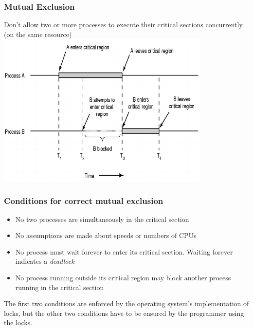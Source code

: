 \documentclass[12pt]{article}
\begin{document}
\subsubsection{Mutual Exclusion}
Don’t allow two or more processes to execute their critical sections concurrently (on the same resource)
\newline
\includegraphics[width=0.8\textwidth]{MutualExclusionOverview.png}
\subsubsection{Conditions for correct mutual exclusion}
\begin{itemize}
    \item No two processes are simultaneously in the critical section 
    \item No assumptions are made about speeds or numbers of CPUs 
    \item No process must wait forever to enter its critical section. Waiting forever indicates a \emph{deadlock}
    \item No process running outside its critical region may block another process running in the critical section
\end{itemize}
The first two conditions are  enforced by the operating system’s implementation of locks, but the other two conditions have to be ensured by the programmer using the locks.
\end{document}
